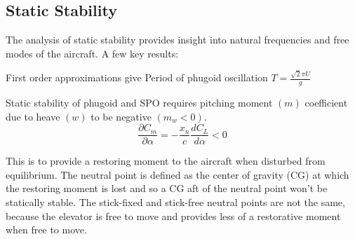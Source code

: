 \documentclass{article}
\begin{document}
\subsection{Static Stability}

The analysis of static stability provides insight into natural frequencies and free modes of the aircraft.
A few key results:

First order approximations give
Period of phugoid oscillation $T = \frac{\sqrt{2} \pi U}{g}$

Static stability of phugoid and SPO requires pitching moment $(m)$ coefficient due to heave $(w)$ to be negative $(m_w < 0)$.
\begin{equation}
    \frac{\partial C_m}{\partial \alpha} = -\frac{x_n}{c}\frac{dC_L}{d\alpha} < 0
\end{equation}

This is to provide a restoring moment to the aircraft when disturbed from equilibrium.
The neutral point is defined as the center of gravity (CG) at which the restoring moment is lost and so a CG aft of the neutral point won't be statically stable.
The stick-fixed and stick-free neutral points are not the same, because the elevator is free to move and provides less of a restorative moment when free to move.
\end{document}
